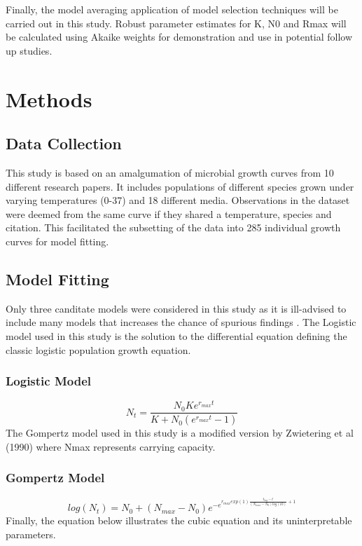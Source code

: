 \documentclass[11pt]{article}
\begin{document}
Finally, the model averaging application of model selection techniques will be carried out in this study. Robust parameter estimates for K, N0 and Rmax will be calculated using Akaike weights for demonstration and use in potential follow up studies.

\section{Methods}

    \subsection{Data Collection}
This study is based on an amalgumation of microbial growth curves from 10 different research papers. It includes populations of different species grown under varying temperatures (0-37) and 18 different media. Observations in the dataset were deemed from the same curve if they shared a temperature, species and citation. This facilitated the subsetting of the data into 285 individual growth curves for model fitting.

    \subsection*{Model Fitting}
Only three canditate models were considered in this study as it is ill-advised to include many models that increases the chance of spurious findings \cite{JOHNSON2004101}. The Logistic model used in this study is the solution to the differential equation defining the classic logistic population growth equation.
    \subsubsection{Logistic Model}
    \begin{equation}
        N_t = \frac{N_0Ke^{r_{max}t}}{K+N_0(e^{r_{max}t} - 1)}
      \end{equation}
The Gompertz model used in this study is a modified version by Zwietering et al (1990) \cite{Zwietering1990} where Nmax represents carrying capacity. 
    \subsubsection{Gompertz Model}
    \begin{equation}
        log(N_t) = N_0 + (N_{max}-N_0)e^{-e^{r_{max}exp(1)\frac{t_{lag}-t}{(N_{max}-N_0)log(10)}+1}}
        \end{equation}
Finally, the equation below illustrates the cubic equation and its uninterpretable parameters.
\end{document}

